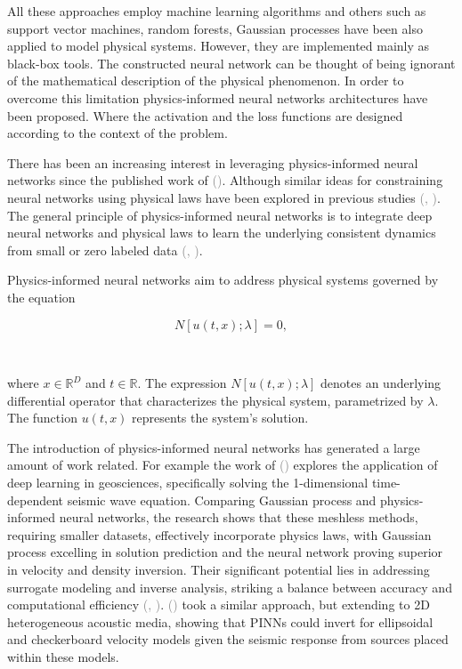 \documentclass{tufte-handout}
\renewcommand{\citep}[2][]{\textcolor{gray}{(\citeauthor{#2}, \citeyear[#1]{#2})}}
\renewcommand{\citeauthoryear}[2][]{\textcolor{gray}{\citeauthor{#2} (\textcolor{gray}{\citeyear[#1]{#2}})}}
\begin{document}
 All these approaches employ machine learning algorithms and others such as support vector machines, random forests, Gaussian processes have been also applied to model physical systems. However, they are implemented mainly as black-box tools. The constructed neural network can be thought of being ignorant of the mathematical description of the physical phenomenon. In order to overcome this limitation physics-informed neural networks architectures have been proposed. Where the activation and the loss functions are designed according to the context of the problem.

There has been an increasing interest in leveraging physics-informed neural networks since the published work of \citeauthoryear{Raissi2019}. Although similar ideas for constraining neural networks using physical laws have been explored in previous studies \citep{lagaris_artificial_1998}. The general principle of physics-informed neural networks is to integrate deep neural networks and physical laws to learn the underlying consistent dynamics from small or zero labeled data \citep{karniadakis_physics-informed_2021}.

Physics-informed neural networks aim to address physical systems governed by the equation

$$
N[u(t, x); \lambda] = 0,
$$

\

where \(x \in \mathbb{R}^D\) and \(t \in \mathbb{R}\). The expression \(N[u(t, x); \lambda]\) denotes an underlying differential operator that characterizes the physical system, parametrized by \(\lambda\). The function \(u(t, x)\) represents the system's solution.


The introduction of physics-informed neural networks has generated a large amount of work related. For example the work of \citeauthoryear{karimpouli_physics_2020} explores the application of deep learning in geosciences, specifically solving the 1-dimensional time-dependent seismic wave equation. Comparing Gaussian process and physics-informed neural networks, the research shows that these meshless methods, requiring smaller datasets, effectively incorporate physics laws, with Gaussian process excelling in solution prediction and the neural network proving superior in velocity and density inversion. Their significant potential lies in addressing surrogate modeling and inverse analysis, striking a balance between accuracy and computational efficiency \citep{Song2022}. \citeauthoryear{rash_2022} took a similar approach, but extending to 2D heterogeneous acoustic media, showing that PINNs could invert for ellipsoidal and checkerboard velocity models given the seismic response from sources placed within these models.
\end{document}

